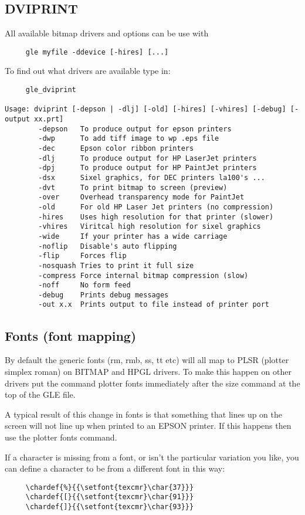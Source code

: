 \subsection{DVIPRINT}
All available bitmap drivers and options can be use with 
\begin{verbatim}
     gle myfile -ddevice [-hires] [...]
\end{verbatim} 
To find out what drivers are available type in:
\begin{verbatim}
     gle_dviprint

Usage: dviprint [-depson | -dlj] [-old] [-hires] [-vhires] [-debug] [-output xx.prt]
        -depson   To produce output for epson printers 
        -dwp      To add tiff image to wp .eps file 
        -dec      Epson color ribbon printers 
        -dlj      To produce output for HP LaserJet printers 
        -dpj      To produce output for HP PaintJet printers 
        -dsx      Sixel graphics, for DEC printers la100's ...
        -dvt      To print bitmap to screen (preview) 
        -over     Overhead transparency mode for PaintJet
        -old      For old HP Laser Jet printers (no compression)
        -hires    Uses high resolution for that printer (slower)
        -vhires   Viritcal high resolution for sixel graphics
        -wide     If your printer has a wide carriage 
        -noflip   Disable's auto flipping 
        -flip     Forces flip  
        -nosquash Tries to print it full size
        -compress Force internal bitmap compression (slow) 
        -noff     No form feed
        -debug    Prints debug messages
        -out x.x  Prints output to file instead of printer port
\end{verbatim}
% 
\subsection{Fonts (font mapping)}
By default the generic fonts (rm, rmb, ss, tt etc) will all map
to PLSR (plotter simplex roman) on BITMAP and HPGL drivers.  To make
this happen on other drivers put the command 
{\sf plotter fonts} immediately after the {\sf size} command 
at the top of the GLE file.

A typical result of this change in fonts is that something 
that lines up on the screen will not line up when printed 
to an EPSON printer.  If this happens then use the {\sf plotter fonts}
command.

If a character is missing from a font, or isn't the particular 
variation you like, you can define a character to be from 
a different font in this way: 
\begin{verbatim}
     \chardef{%}{{\setfont{texcmr}\char{37}}} 
     \chardef{[}{{\setfont{texcmr}\char{91}}} 
     \chardef{]}{{\setfont{texcmr}\char{93}}} 
\end{verbatim}

